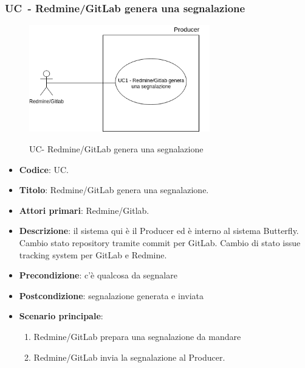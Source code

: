 \subsubsection{UC\theuccount\ - Redmine/GitLab genera una segnalazione}
    \begin{figure}[H]
		\centering
		\includegraphics[width=0.7\textwidth]{img/UC1.png}\\
		\caption{UC\theuccount - Redmine/GitLab genera una segnalazione}
	\end{figure}
	\begin{itemize}
		\item \textbf{Codice}: UC\theuccount.
		\item \textbf{Titolo}: Redmine/GitLab genera una segnalazione.
		\item \textbf{Attori primari}: Redmine/Gitlab.
		\item \textbf{Descrizione}:
		 il sistema qui è il Producer ed è interno al sistema Butterfly. Cambio stato repository tramite commit per GitLab. Cambio di stato issue tracking system per GitLab e Redmine.
		\item \textbf{Precondizione}: c'è qualcosa da segnalare
		\item \textbf{Postcondizione}: segnalazione generata e inviata
		\item \textbf{Scenario principale}: 
		\begin{enumerate}
			\item Redmine/GitLab prepara una segnalazione da mandare
			\item Redmine/GitLab invia la segnalazione al Producer.
		\end{enumerate}
		
	\end{itemize}

